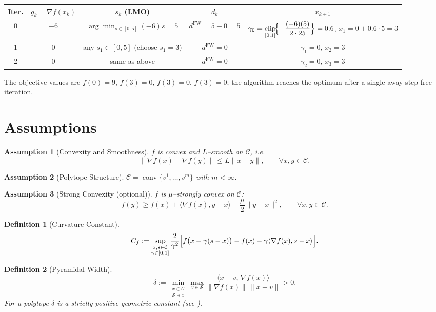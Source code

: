 \documentclass{article}
\newtheorem{definition}{Definition}
\newtheorem{assumption}{Assumption}
\newcommand{\C}{\mathcal{C}}
\begin{document}
\begin{center}
\begin{tabular}{c|c|c|c|c}
\textbf{Iter.}&$g_{k}=\nabla f(x_{k})$&$s_{k}$ (LMO)&$d_{k}$&$x_{k+1}$\\ \hline
0&$-6$&$\displaystyle\arg\min_{s\in[0,5]}(-6)s=5$&$d^{\text{FW}}=5-0=5$&
$\displaystyle\gamma_{0}= \operatorname*{clip}_{[0,1]}\!\Bigl\{-\frac{(-6)(5)}{2\cdot25}\Bigr\}=0.6$, $x_{1}=0+0.6\cdot5=3$\\[6pt]
1&$0$&any $s_{1}\in[0,5]$ (choose $s_{1}=3$)&$d^{\text{FW}}=0$&
$\gamma_{1}=0$, $x_{2}=3$\\[4pt]
2&$0$&same as above&$d^{\text{FW}}=0$&
$\gamma_{2}=0$, $x_{3}=3$
\end{tabular}
\end{center}
The objective values are $f(0)=9$, $f(3)=0$, $f(3)=0$, $f(3)=0$; the algorithm reaches the optimum after a single away‑step‑free iteration.

\newpage
\section*{Assumptions}
\begin{assumption}[Convexity and Smoothness]\label{as:convex}
$f$ is convex and $L$–smooth on $\C$, i.e.
\[
\|\nabla f(x)-\nabla f(y)\|\le L\|x-y\|,\qquad \forall x,y\in\C .
\]
\end{assumption}
\begin{assumption}[Polytope Structure]\label{as:polytope}
$\C=\operatorname{conv}\{v^{1},\dots ,v^{m}\}$ with $m<\infty$.
\end{assumption}
\begin{assumption}[Strong Convexity (optional)]\label{as:strong}
$f$ is $\mu$–strongly convex on $\C$:
\[
f(y)\ge f(x)+\langle\nabla f(x),y-x\rangle+\frac{\mu}{2}\|y-x\|^{2},
\qquad \forall x,y\in\C .
\]
\end{assumption}
\begin{definition}[Curvature Constant]\label{def:curv}
\[
C_{f}:=\sup_{\substack{x,s\in\C\\\gamma\in[0,1]}}
\frac{2}{\gamma^{2}}\Bigl[f\bigl(x+\gamma(s-x)\bigr)-f(x)-\gamma\langle\nabla f(x),s-x\rangle\Bigr].
\]
\end{definition}
\begin{definition}[Pyramidal Width]\label{def:pyr}
\[
\delta:=\min_{\substack{x\in\C\\\mathcal{S}\ni x}}
\max_{v\in\mathcal{S}} \frac{\langle x-v,\, \nabla f(x)\rangle}
                         {\|\nabla f(x)\|\,\|x-v\|}>0 .
\]
For a polytope $\delta$ is a strictly positive geometric constant (see
\cite{lacoste2015global}).
\end{definition}
\end{document}
